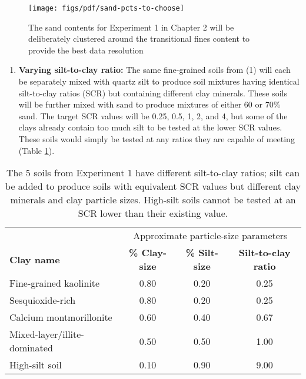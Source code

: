 \documentclass[
  letterpaper,
  openany]{book}
\providecommand{\tightlist}{%
  \setlength{\itemsep}{0pt}\setlength{\parskip}{0pt}}
\begin{document}
\begin{figure}

{\centering \texttt{[image: figs/pdf/sand-pcts-to-choose]} 

}

\caption[Clustering of sand contents for best data resolution]{The sand contents for Experiment 1 in Chapter 2 will be deliberately clustered around the transitional fines content to provide the best data resolution}\label{fig:sand-content-clustering}
\end{figure}

\begin{enumerate}
\def\labelenumi{\arabic{enumi}.}
\setcounter{enumi}{1}
\tightlist
\item
  \textbf{Varying silt-to-clay ratio:} The same fine-grained soils from (1) will each be separately mixed with quartz silt to produce soil mixtures having identical silt-to-clay ratios (SCR) but containing different clay minerals.
  These soils will be further mixed with sand to produce mixtures of either 60 or 70\% sand.
  The target SCR values will be 0.25, 0.5, 1, 2, and 4, but some of the clays already contain too much silt to be tested at the lower SCR values.
  These soils would simply be tested at any ratios they are capable of meeting (Table \ref{tab:planned-scr-values}).
\end{enumerate}

\begin{table}

\caption[Adjusted silt-to-clay ratios of "pure" clays]{\label{tab:planned-scr-values}The 5 soils from Experiment 1 have different silt-to-clay ratios; silt can be added to produce soils with equivalent SCR values but different clay minerals and clay particle sizes. High-silt soils cannot be tested at an SCR lower than their existing value.}
\centering
\begin{tabular}[t]{lccc}
\toprule
\multicolumn{1}{c}{ } & \multicolumn{3}{c}{Approximate particle-size parameters} \\
\cmidrule(l{3pt}r{3pt}){2-4}
\textbf{Clay name} & \textbf{\% Clay-size} & \textbf{\% Silt-size} & \textbf{Silt-to-clay ratio}\\
\midrule
Fine-grained kaolinite & 0.80 & 0.20 & 0.25\\
Sesquioxide-rich & 0.80 & 0.20 & 0.25\\
Calcium montmorillonite & 0.60 & 0.40 & 0.67\\
Mixed-layer/illite-dominated & 0.50 & 0.50 & 1.00\\
High-silt soil & 0.10 & 0.90 & 9.00\\
\bottomrule
\end{tabular}
\end{table}
\end{document}
